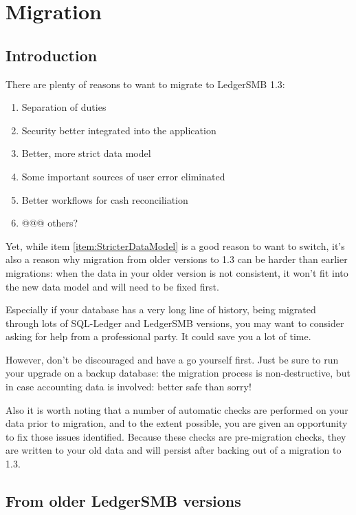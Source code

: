 \chapter{Migration}
\label{app-migration}

\section{Introduction}
\label{sec-migration-introduction}

There are plenty of reasons to want to migrate to LedgerSMB 1.3:

\begin{enumerate}
\item Separation of duties
\item Security better integrated into the application
\item Better, more strict data model
\label{item:StricterDataModel}
\item Some important sources of user error eliminated
\item Better workflows for cash reconciliation
\item @@@ others?
\end{enumerate}

Yet, while item \ref{item:StricterDataModel} is a good reason to want to switch, it's
also a reason why migration from older versions to 1.3 can be harder than earlier
migrations: when the data
in your older version is not consistent, it won't fit into the new data model and
will need to be fixed first.

Especially if your database has a very long line of history, being migrated through
lots of SQL-Ledger and LedgerSMB versions, you may want to consider asking for help
from a professional party. It could save you a lot of time.

However, don't be discouraged and have a go yourself first. Just be sure to run
your upgrade on a backup database: the migration process is non-destructive, but
in case accounting data is involved: better safe than sorry!

Also it is worth noting that a number of automatic checks are performed on your
data prior to migration, and to the extent possible, you are given an
opportunity to fix those issues identified.  Because these checks are
pre-migration checks, they are written to your old data and will persist after
backing out of a migration to 1.3.

\section{From older LedgerSMB versions}
\label{sec-migration-from-older-ledgersmb}

